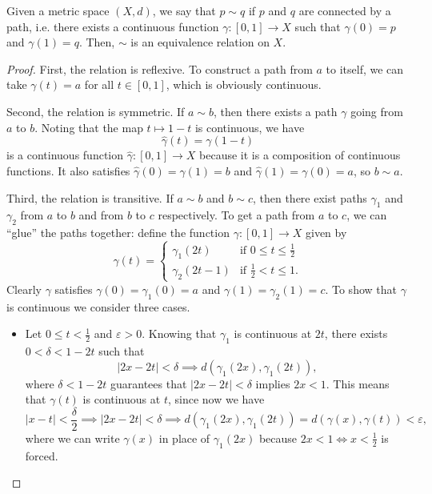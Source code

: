 \documentclass[11pt]{scrartcl}
\providecommand{\eps}{\varepsilon}
\providecommand{\half}{\frac{1}{2}}
\providecommand{\ii}{\item}
\begin{document}
\begin{lemma}
	Given a metric space $(X, d)$, we say that
	$p\sim q$ if $p$ and $q$ are connected by a path,
	i.e. there exists a continuous function
	$\gamma\colon[0,1]\to X$ such that
	$\gamma(0) = p$ and $\gamma(1) = q$.
	Then, $\sim$ is an equivalence relation on $X$.
\end{lemma}

\begin{proof}
	First, the relation is reflexive.
	To construct a path from $a$ to itself,
	we can take $\gamma(t) = a$ for all $t\in[0,1]$,
	which is obviously continuous.
	
	Second, the relation is symmetric.
	If $a\sim b$, then there exists a path $\gamma$ going from $a$ to $b$.
	Noting that the map $t\mapsto 1-t$ is continuous, we have
	\[\widehat\gamma(t) = \gamma(1-t)\]
	is a continuous function $\widehat\gamma\colon[0,1]\to X$
	because it is a composition of continuous functions.
	It also satisfies $\widehat\gamma(0) = \gamma(1) = b$ and
	$\widehat\gamma(1) = \gamma(0) = a$, so $b\sim a$.
	
	Third, the relation is transitive.
	If $a\sim b$ and $b\sim c$, then
	there exist paths $\gamma_1$ and $\gamma_2$
	from $a$ to $b$ and from $b$ to $c$ respectively.
	To get a path from $a$ to $c$, we can ``glue'' the paths together:
	define the function $\gamma\colon[0,1]\to X$ given by
	\[\gamma(t) = \begin{cases}
		\gamma_1(2t) & \text{if }0 \le t \le \half\\
		\gamma_2(2t - 1) & \text{if }\half < t \le 1.
	\end{cases}\]
	Clearly $\gamma$ satisfies $\gamma(0) = \gamma_1(0) = a$
	and $\gamma(1) = \gamma_2(1) = c$.
	To show that $\gamma$ is continuous we consider three cases.
	\begin{itemize}
		\ii Let $0 \le t < \half$ and $\eps > 0$.
		Knowing that $\gamma_1$ is continuous at $2t$,
		there exists $0 < \delta < 1 - 2t$ such that
		\[|2x - 2t| < \delta \implies d(\gamma_1(2x), \gamma_1(2t)),\]
		where $\delta < 1 - 2t$ guarantees that
		$|2x - 2t| < \delta$ implies $2x < 1$.
		This means that $\gamma(t)$ is continuous at $t$, since now we have
		\[|x - t| < \frac{\delta}{2} \implies
		|2x - 2t| < \delta \implies d(\gamma_1(2x), \gamma_1(2t))
		= d(\gamma(x), \gamma(t)) < \eps,\]
		where we can write $\gamma(x)$ in place of $\gamma_1(2x)$
		because $2x < 1 \iff x < \half$ is forced.
		

\end{itemize}
\end{proof}
\end{document}
